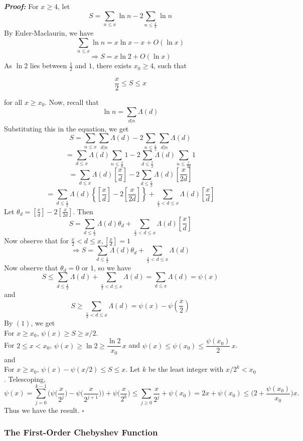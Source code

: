 \documentclass[a4paper,11pt,abstracton]{scrartcl}
\theoremstyle{dotlessP}
\theoremstyle{dotlessS}
\theoremstyle{remark}
\theoremstyle{definition}
\begin{document}
\begin{claim_box}
\textbf{\textit{Proof:}}
For $x \ge 4$, let
$$S=\sum_{n \le x}\ln n - 2\sum_{n \le \frac{x}{2}} \ln n$$
By Euler-Maclaurin, we have 
$$\sum_{n \le x}\ln n = x\ln x - x + O(\ln x)$$
$$\Rightarrow S = x\ln 2 + O(\ln x)$$
As $\ln 2$ lies between $\frac{1}{2}$ and $1$, there exists $x_0 \ge 4$, such that

\setcounter{equation}{0}
\begin{equation}\label{eq:sim}
  \frac{x}{2} \le S \le x
\end{equation}

for all $x \ge x_0$. Now, recall that 
$$\ln n = \sum_{d|n}\Lambda(d)$$
Substituting this in the equation, we get
$$S = \sum_{n \le x}\sum_{d|n}\Lambda(d)-2\sum_{n \le \frac{x}{2}}\sum_{d|n}\Lambda(d)$$
$$=\sum_{d \le x}\Lambda(d)\sum_{n \le \frac{x}{d}}1 - 2\sum_{d \le \frac{x}{2}}\Lambda(d)\sum_{n \le \frac{x}{2d}}1$$
$$=\sum_{d \le x}\Lambda(d)[\frac{x}{d}] - 2\sum_{d \le \frac{x}{2}}\Lambda(d)[\frac{x}{2d}]$$
$$=\sum_{d \le \frac{x}{2}}\Lambda(d)\left\{[\frac{x}{d}]- 2[\frac{x}{2d}]\right\} + \sum_{\frac{x}{2} < d \le x}\Lambda(d)[\frac{x}{d}]$$
Let $\theta_d =  [\frac{x}{d}]- 2[\frac{x}{2d}]$. Then
$$S=\sum_{d \le \frac{x}{2}}\Lambda(d)\theta_d + \sum_{\frac{x}{2} < d \le x}\Lambda(d)[\frac{x}{d}]$$
Now observe that for $\frac{x}{2} < d \le x, [\frac{x}{d}]=1$
$$\Rightarrow S=\sum_{d \le \frac{x}{2}}\Lambda(d)\theta_d + \sum_{\frac{x}{2} < d \le x}\Lambda(d)$$
Now observe that $\theta_d = 0 \text{ or } 1$, so we have
$$S \le \sum_{d \le \frac{x}{2}}\Lambda(d) + \sum_{\frac{x}{2} < d \le x}\Lambda(d) = \sum_{d \le x}\Lambda(d) = \psi(x)$$
and 
$$S \ge \sum_{\frac{x}{2} < d \le x}\Lambda(d) = \psi(x) - \psi(\frac{x}{2})$$
By $(1)$, we get 
\\For $x\ge x_0$, $\psi(x)\ge S\ge x/2$. 
\\For $2\le x<x_0$,
$\psi(x)\ge \ln 2\ge \dfrac{\ln 2}{x_0}\,x$ and $\psi(x)\le\psi(x_0)\le\dfrac{\psi(x_0)}{2}\,x$.
\\and
\\For $x\ge x_0$, $\psi(x)-\psi(x/2)\le S\le x$. Let $k$ be the least
integer with $x/2^k<x_0$. Telescoping,
\[\psi(x)=\sum_{j=0}^{k-1}\bigg(\psi\big(\dfrac{x}{2^j}\big)-\psi\big(\dfrac{x}{2^{j+1}}\big)\bigg)+\psi\bigg(\dfrac{x}{2^k}\bigg)
\le \sum_{j\ge0}\dfrac{x}{2^j}+\psi(x_0)=2x+\psi(x_0)\le\bigg(2+\dfrac{\psi(x_0)}{x_0}\bigg)x.\]
Thus we have the result.
\hfill$\square$
\end{claim_box}
 
\subsubsection*{The First-Order Chebyshev Function}
\end{document}
